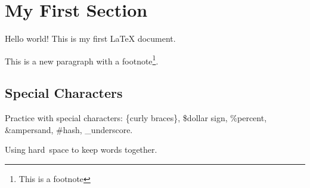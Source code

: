 \documentclass[a4paper,12pt]{article}
\begin{document}
\section{My First Section}
Hello world! This is my first LaTeX document.

This is a new paragraph with a footnote\footnote{This is a footnote}.

\subsection{Special Characters}
Practice with special characters: 
\{curly braces\}, \$dollar sign, \%percent, \&ampersand, \#hash, \_underscore.

Using hard~space to keep words together.
\end{document}
